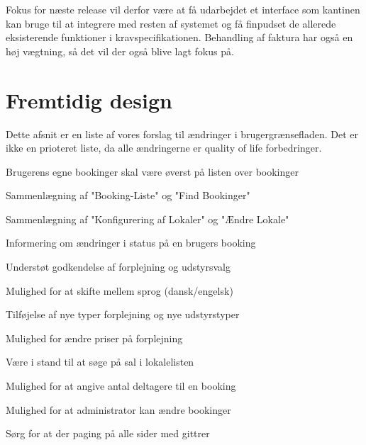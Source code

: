 Fokus for næste release vil derfor være at få udarbejdet et interface som kantinen kan bruge til at integrere med resten af systemet og få finpudset de allerede eksisterende funktioner i kravspecifikationen. Behandling af faktura har også en høj vægtning, så det vil der også blive lagt fokus på. 


\section{Fremtidig design}
\label{Design_G_Future}
Dette afsnit er en liste af vores forslag til ændringer i brugergrænsefladen. Det er ikke en prioteret liste, da alle ændringerne er quality of life forbedringer.

\begin{my_itemize}
\item{Brugerens egne bookinger skal være øverst på listen over bookinger}
\item{Sammenlægning af "Booking-Liste" og "Find Bookinger"}
\item{Sammenlægning af "Konfigurering af Lokaler" og "Ændre Lokale"}
\item{Informering om ændringer i status på en brugers booking}
\item{Understøt godkendelse af forplejning og udstyrsvalg}
\item{Mulighed for at skifte mellem sprog (dansk/engelsk)}
\item{Tilføjelse af nye typer forplejning og nye udstyrstyper}
\item{Mulighed for ændre priser på forplejning}
\item{Være i stand til at søge på sal i lokalelisten}
\item{Mulighed for at angive antal deltagere til en booking}
\item{Mulighed for at administrator kan ændre bookinger}
\item{Sørg for at der paging på alle sider med gittrer}
\end{my_itemize}
